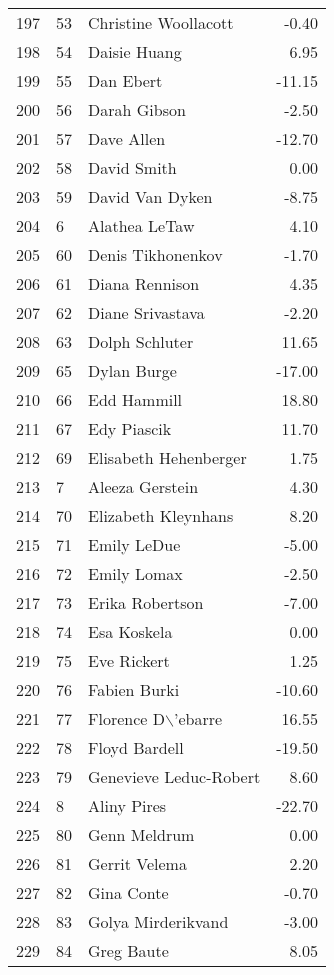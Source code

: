 \begin{table}[ht]
\begin{tabular}{rllr}
  197 & 53 & Christine Woollacott & -0.40 \\ 
  198 & 54 & Daisie Huang & 6.95 \\ 
  199 & 55 & Dan Ebert & -11.15 \\ 
  200 & 56 & Darah Gibson & -2.50 \\ 
  201 & 57 & Dave Allen & -12.70 \\ 
  202 & 58 & David Smith & 0.00 \\ 
  203 & 59 & David Van Dyken & -8.75 \\ 
  204 & 6 & Alathea LeTaw & 4.10 \\ 
  205 & 60 & Denis Tikhonenkov & -1.70 \\ 
  206 & 61 & Diana Rennison & 4.35 \\ 
  207 & 62 & Diane Srivastava & -2.20 \\ 
  208 & 63 & Dolph Schluter & 11.65 \\ 
  209 & 65 & Dylan Burge & -17.00 \\ 
  210 & 66 & Edd Hammill & 18.80 \\ 
  211 & 67 & Edy Piascik & 11.70 \\ 
  212 & 69 & Elisabeth Hehenberger & 1.75 \\ 
  213 & 7 & Aleeza Gerstein & 4.30 \\ 
  214 & 70 & Elizabeth Kleynhans & 8.20 \\ 
  215 & 71 & Emily LeDue & -5.00 \\ 
  216 & 72 & Emily Lomax & -2.50 \\ 
  217 & 73 & Erika Robertson & -7.00 \\ 
  218 & 74 & Esa Koskela & 0.00 \\ 
  219 & 75 & Eve Rickert & 1.25 \\ 
  220 & 76 & Fabien Burki & -10.60 \\ 
  221 & 77 & Florence D$\backslash$'ebarre & 16.55 \\ 
  222 & 78 & Floyd Bardell & -19.50 \\ 
  223 & 79 & Genevieve Leduc-Robert & 8.60 \\ 
  224 & 8 & Aliny Pires & -22.70 \\ 
  225 & 80 & Genn Meldrum & 0.00 \\ 
  226 & 81 & Gerrit Velema & 2.20 \\ 
  227 & 82 & Gina Conte & -0.70 \\ 
  228 & 83 & Golya Mirderikvand & -3.00 \\ 
  229 & 84 & Greg Baute & 8.05 \\ 

\end{tabular}
\end{table}
